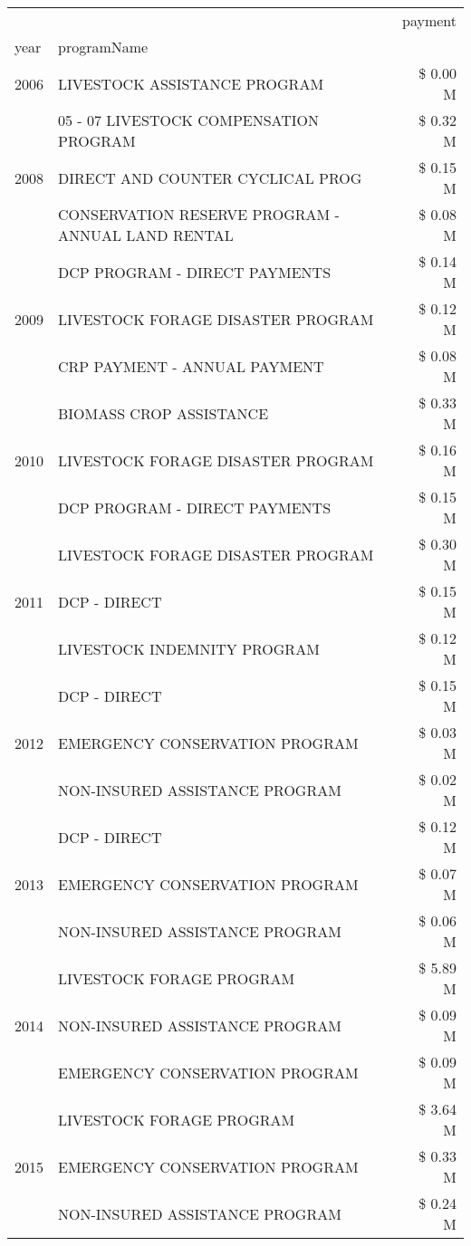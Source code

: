 \begin{tabular}{llr}
\toprule
 &  & payment \\
year & programName &  \\
\midrule
2006 & LIVESTOCK ASSISTANCE PROGRAM & \$ 0.00 M \\
\cline{1-3}
\multirow[t]{3}{*}{2008} & 05 - 07 LIVESTOCK COMPENSATION PROGRAM & \$ 0.32 M \\
 & DIRECT AND COUNTER CYCLICAL PROG & \$ 0.15 M \\
 & CONSERVATION RESERVE PROGRAM - ANNUAL LAND RENTAL & \$ 0.08 M \\
\cline{1-3}
\multirow[t]{3}{*}{2009} & DCP PROGRAM - DIRECT PAYMENTS & \$ 0.14 M \\
 & LIVESTOCK FORAGE DISASTER  PROGRAM & \$ 0.12 M \\
 & CRP PAYMENT - ANNUAL PAYMENT & \$ 0.08 M \\
\cline{1-3}
\multirow[t]{3}{*}{2010} & BIOMASS CROP ASSISTANCE & \$ 0.33 M \\
 & LIVESTOCK FORAGE DISASTER  PROGRAM & \$ 0.16 M \\
 & DCP PROGRAM - DIRECT PAYMENTS & \$ 0.15 M \\
\cline{1-3}
\multirow[t]{3}{*}{2011} & LIVESTOCK FORAGE DISASTER PROGRAM & \$ 0.30 M \\
 & DCP - DIRECT & \$ 0.15 M \\
 & LIVESTOCK INDEMNITY PROGRAM & \$ 0.12 M \\
\cline{1-3}
\multirow[t]{3}{*}{2012} & DCP - DIRECT & \$ 0.15 M \\
 & EMERGENCY CONSERVATION PROGRAM & \$ 0.03 M \\
 & NON-INSURED ASSISTANCE PROGRAM & \$ 0.02 M \\
\cline{1-3}
\multirow[t]{3}{*}{2013} & DCP - DIRECT & \$ 0.12 M \\
 & EMERGENCY CONSERVATION PROGRAM & \$ 0.07 M \\
 & NON-INSURED ASSISTANCE PROGRAM & \$ 0.06 M \\
\cline{1-3}
\multirow[t]{3}{*}{2014} & LIVESTOCK FORAGE PROGRAM & \$ 5.89 M \\
 & NON-INSURED ASSISTANCE PROGRAM & \$ 0.09 M \\
 & EMERGENCY CONSERVATION PROGRAM & \$ 0.09 M \\
\cline{1-3}
\multirow[t]{3}{*}{2015} & LIVESTOCK FORAGE PROGRAM & \$ 3.64 M \\
 & EMERGENCY CONSERVATION PROGRAM & \$ 0.33 M \\
 & NON-INSURED ASSISTANCE PROGRAM & \$ 0.24 M \\

\end{tabular}
